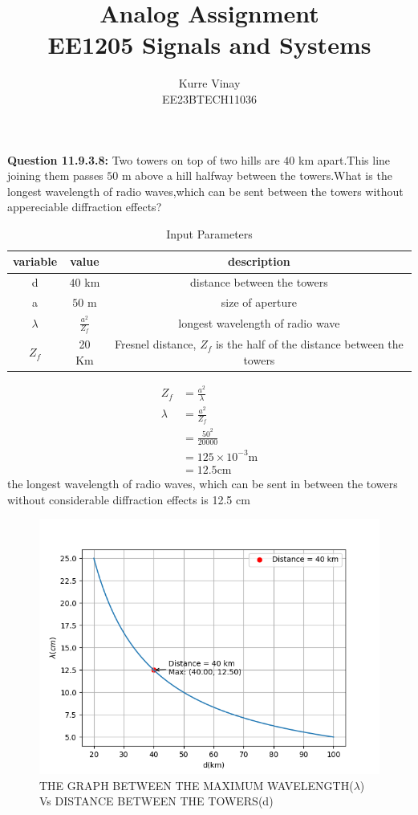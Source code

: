 \documentclass[a4,12pt,onecolumn]{IEEEtran}
\begin{document}
\title{
\Huge\textbf{ Analog Assignment}\\
\Huge\textbf{EE1205} Signals and Systems\\
}
\large\author{Kurre Vinay\\EE23BTECH11036}
\maketitle
\textbf{Question 11.9.3.8:}
 Two towers on top of two hills are $40$ km apart.This line joining them passes $50$ m above a hill halfway between the towers.What is the longest wavelength of radio waves,which can be sent between the towers without  appereciable diffraction effects?\\
\solution
\begin{table}[ht!]
 \begin{center}
\begin{tabular}{|c|c|c|}
   \hline
   variable&value&description  \\
   \hline
   d & $40$ km& distance between the towers\\
   \hline
   a & $50$ m & size of aperture \\
   \hline
   $\lambda$ &$\frac{a^2}{Z_f} $ & longest wavelength of radio wave\\
   \hline
   $Z_f$ &20 Km &Fresnel distance, $Z_f$ is the half of the distance between the towers \\
   \hline
\end{tabular}
\caption{\large{Input Parameters}}
\end{center}
\end{table}
\begin{align}
Z_f&=\frac{a^2}{\lambda}\\
\lambda &= \frac{a^2}{Z_f}\\
&=\frac{50^2}{20000}\\
&= 125 \times 10^{-3} \text{m}\\
&= 12.5 \text{cm}\end{align}
the longest wavelength of radio waves, which can be sent in between the towers without considerable diffraction effects is 12.5 cm 
\begin{figure}[ht!]
\includegraphics[width=\columnwidth]{figs/fig2.png}
\caption{THE GRAPH BETWEEN THE MAXIMUM WAVELENGTH($\lambda$) Vs DISTANCE BETWEEN THE TOWERS(d)}
\end{figure}
\end{document}
